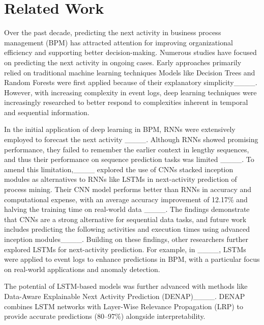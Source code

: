 \section{Related Work}
Over the past decade, predicting the next activity in business process management (BPM) has attracted attention for improving organizational efficiency and supporting better decision-making. Numerous studies have focused on predicting the next activity in ongoing cases. Early approaches primarily relied on traditional machine learning techniques Models like Decision Trees and Random Forests were first applied because of their explanatory simplicity____. However, with increasing complexity in event logs, deep learning techniques were increasingly researched to better respond to complexities inherent in temporal and sequential information.

In the initial application of deep learning in BPM, RNNs were extensively employed to forecast the next activity ____. Although RNNs showed promising performance, they failed to remember the earlier context in lengthy
sequences, and thus their performance on sequence prediction tasks was limited ____. To amend this limitation,____ explored the use of CNNs stacked inception modules as alternatives to RNNs like LSTMs in next-activity prediction of process mining. Their CNN model performs better than RNNs in accuracy and computational expense, with an average accuracy improvement of 12.17\% and halving the training time on real-world data ____. The findings demonstrate that CNNs are a strong alternative for sequential data tasks, and future work includes predicting the following activities and execution times using advanced inception modules____. Building on these findings, other researchers further explored LSTMs for next-activity prediction. For example, in ____, LSTMs were applied to event logs to enhance predictions in BPM, with a particular focus on real-world applications and anomaly detection. 

The potential of LSTM-based models was further advanced with methods like Data-Aware Explainable Next Activity Prediction (DENAP)____. DENAP combines LSTM networks with Layer-Wise Relevance Propagation (LRP) to provide accurate predictions (80–97\%) alongside interpretability.


